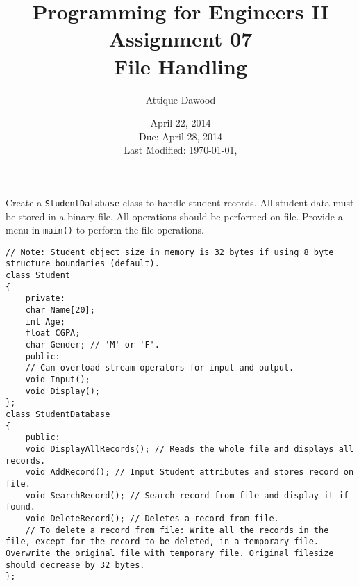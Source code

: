 \documentclass[12pt,a4paper]{article}
\title{\vspace{-2cm}Programming for Engineers II\\Assignment 07\\File Handling}
\author{Attique Dawood}
\date{April 22, 2014\\Due: April 28, 2014\\[0.2cm] Last Modified: \today, \currenttime}
\begin{document}
\maketitle
Create a \verb|StudentDatabase| class to handle student records. All student data must be stored in a binary file. All operations should be performed on file. Provide a menu in \verb|main()| to perform the file operations.
\begin{lstlisting}
// Note: Student object size in memory is 32 bytes if using 8 byte structure boundaries (default).
class Student
{
	private:
	char Name[20];
	int Age;
	float CGPA;
	char Gender; // 'M' or 'F'.
	public:
	// Can overload stream operators for input and output.
	void Input();
	void Display();
};
class StudentDatabase
{
	public:
	void DisplayAllRecords(); // Reads the whole file and displays all records.
	void AddRecord(); // Input Student attributes and stores record on file.
	void SearchRecord(); // Search record from file and display it if found.
	void DeleteRecord(); // Deletes a record from file.
	// To delete a record from file: Write all the records in the file, except for the record to be deleted, in a temporary file. Overwrite the original file with temporary file. Original filesize should decrease by 32 bytes.
};
\end{lstlisting}
\end{document}
